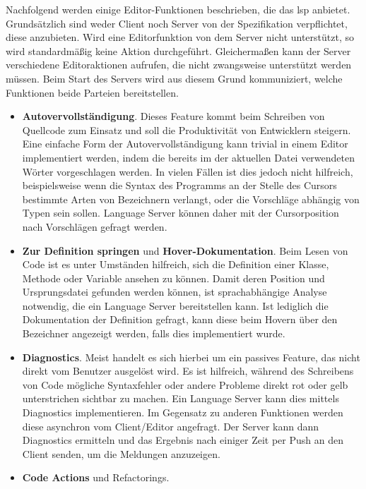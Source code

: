 Nachfolgend werden einige Editor-Funktionen beschrieben, die das \ac{lsp} anbietet.
Grundsätzlich sind weder Client noch Server von der Spezifikation verpflichtet, diese anzubieten.
Wird eine Editorfunktion von dem Server nicht unterstützt, so wird standardmäßig keine Aktion durchgeführt.\cite{lsp-overview}
Gleichermaßen kann der Server verschiedene Editoraktionen aufrufen, die nicht zwangsweise unterstützt werden müssen.
Beim Start des Servers wird aus diesem Grund kommuniziert, welche Funktionen beide Parteien bereitstellen.\cite[Initialize Request]{lsp-spec}

\begin{itemize}
    \item \textbf{Autovervollständigung}.
    Dieses Feature kommt beim Schreiben von Quellcode zum Einsatz und soll die Produktivität von Entwicklern steigern.
    Eine einfache Form der Autovervollständigung kann trivial in einem Editor implementiert werden, indem die bereits im der aktuellen Datei verwendeten Wörter vorgeschlagen werden.
    In vielen Fällen ist dies jedoch nicht hilfreich, beispielsweise wenn die Syntax des Programms an der Stelle des Cursors bestimmte Arten von Bezeichnern verlangt, oder die Vorschläge abhängig von Typen sein sollen.
    Language Server können daher mit der Cursorposition nach Vorschlägen gefragt werden.
    \item \textbf{Zur Definition springen} und \textbf{Hover-Dokumentation}.
    Beim Lesen von Code ist es unter Umständen hilfreich, sich die Definition einer Klasse, Methode oder Variable ansehen zu können.
    Damit deren Position und Ursprungsdatei gefunden werden können, ist sprachabhängige Analyse notwendig, die ein Language Server bereitstellen kann.
    Ist lediglich die Dokumentation der Definition gefragt, kann diese beim Hovern über den Bezeichner angezeigt werden, falls dies implementiert wurde.
    \item \textbf{Diagnostics}.
    Meist handelt es sich hierbei um ein passives Feature, das nicht direkt vom Benutzer ausgelöst wird.
    Es ist hilfreich, während des Schreibens von Code mögliche Syntaxfehler oder andere Probleme direkt rot oder gelb unterstrichen sichtbar zu machen.
    Ein Language Server kann dies mittels Diagnostics implementieren.
    Im Gegensatz zu anderen Funktionen werden diese asynchron vom Client/Editor angefragt.
    Der Server kann dann Diagnostics ermitteln und das Ergebnis nach einiger Zeit per Push an den Client senden, um die Meldungen anzuzeigen.
    \item \textbf{Code Actions} und Refactorings.

\end{itemize}
